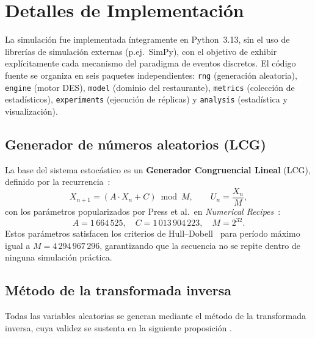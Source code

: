 \section{Detalles de Implementación}

La simulación fue implementada íntegramente en Python~3.13, sin el uso de
librerías de simulación externas (p.ej.\ SimPy), con el objetivo de
exhibir explícitamente cada mecanismo del paradigma de eventos discretos.
El código fuente se organiza en seis paquetes independientes:
\texttt{rng} (generación aleatoria), \texttt{engine} (motor DES),
\texttt{model} (dominio del restaurante), \texttt{metrics} (colección
de estadísticos), \texttt{experiments} (ejecución de réplicas) y
\texttt{analysis} (estadística y visualización).

\subsection{Generador de números aleatorios (LCG)}

La base del sistema estocástico es un \textbf{Generador Congruencial Lineal}
(LCG), definido por la recurrencia~\citep{knuth1997art}:
\begin{equation}
  X_{n+1} = (A \cdot X_n + C) \bmod M, \qquad U_n = \frac{X_n}{M},
  \label{eq:lcg}
\end{equation}
con los parámetros popularizados por Press et al.\ en \textit{Numerical Recipes}~\citep{press2007numerical}:
\[
  A = 1\,664\,525, \quad C = 1\,013\,904\,223, \quad M = 2^{32}.
\]
Estos parámetros satisfacen los criterios de Hull--Dobell~\citep{knuth1997art} para período
máximo igual a $M = 4\,294\,967\,296$, garantizando que la secuencia no se
repite dentro de ninguna simulación práctica.

\subsection{Método de la transformada inversa}

Todas las variables aleatorias se generan mediante el método de la
transformada inversa, cuya validez se sustenta en la siguiente proposición
\citep{curso_conf2,ross2013simulation}.

